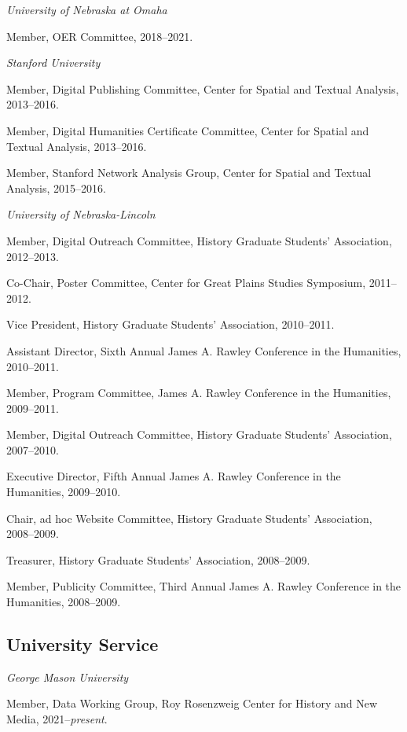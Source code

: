 \documentclass[10pt]{article}
\begin{document}
\textit{University of Nebraska at Omaha}

Member, OER Committee, 2018--2021.

\vspace{.4cm}

\textit{Stanford University}

Member, Digital Publishing Committee, Center for Spatial and Textual Analysis, 2013--2016.

Member, Digital Humanities Certificate Committee, Center for Spatial and Textual Analysis, 2013--2016.

Member, Stanford Network Analysis Group, Center for Spatial and Textual Analysis, 2015--2016.

\vspace{.4cm}

\textit{University of Nebraska-Lincoln}

Member, Digital Outreach Committee, History Graduate Students' Association, 2012--2013.

Co-Chair, Poster Committee, Center for Great Plains Studies Symposium, 2011--2012.

Vice President, History Graduate Students' Association, 2010--2011.

Assistant Director, Sixth Annual James A. Rawley Conference in the Humanities, 2010--2011.

Member, Program Committee, James A. Rawley Conference in the Humanities, 2009--2011.

Member, Digital Outreach Committee, History Graduate Students' Association, 2007--2010.

Executive Director, Fifth Annual James A. Rawley Conference in the Humanities, 2009--2010.

Chair, ad hoc Website Committee, History Graduate Students' Association, 2008--2009.

Treasurer, History Graduate Students' Association, 2008--2009.

Member, Publicity Committee, Third Annual James A. Rawley Conference in the Humanities, 2008--2009.

\subsection{University Service}

\textit{George Mason University}

Member, Data Working Group, Roy Rosenzweig Center for History and New Media, 2021--\textit{present}.
\end{document}
